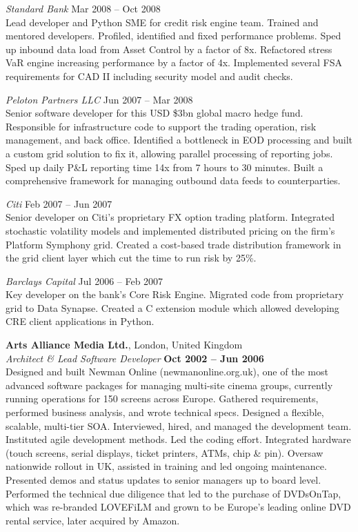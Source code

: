 \documentclass[margin,line]{resume}
\begin{document}
\begin{resume}
    \textsl{Standard Bank} \hfill Mar 2008 -- Oct 2008\\
    Lead developer and Python SME for credit risk engine team. Trained and mentored developers. Profiled, identified and fixed performance
    problems. Sped up inbound data load from Asset Control by a factor of 8x. Refactored stress VaR engine increasing performance by
    a factor of 4x. Implemented several FSA requirements for CAD II including security model and audit checks.     

    \textsl{Peloton Partners LLC} \hfill Jun 2007 -- Mar 2008\\
	Senior software developer for this USD \$3bn global macro hedge fund. Responsible for infrastructure code to 
	support the trading operation, risk management, and back office. Identified a bottleneck in EOD processing and built a 
	custom grid solution to fix it, allowing parallel processing of reporting jobs. Sped up daily P\&L reporting time 14x 
	from 7 hours to 30 minutes. Built a comprehensive framework for managing outbound data feeds to counterparties.
	
    \textsl{Citi} \hfill Feb 2007 -- Jun 2007\\
	Senior developer on Citi's proprietary FX option trading platform. Integrated stochastic volatility models and implemented
	distributed pricing on the firm's Platform Symphony grid. Created a cost-based trade distribution framework in the grid client layer which
	cut the time to run risk by 25\%.
	
    \textsl{Barclays Capital} \hfill Jul 2006 -- Feb 2007\\
	Key developer on the bank’s Core Risk Engine. Migrated code from proprietary grid to Data Synapse. 
	Created a C extension module which allowed developing CRE client applications in Python.
	
    \textbf{Arts Alliance Media Ltd.}, London, United Kingdom \vspace{2mm}\\\vspace{1mm}%
    \textsl{Architect \& Lead Software Developer} \hfill \textbf{Oct 2002 -- Jun 2006}\\
	Designed and built Newman Online (newmanonline.org.uk), one of the most advanced software 
	packages for managing 
 	multi-site cinema groups, currently running operations for 150 screens across Europe. Gathered requirements, 
 	performed business analysis, and wrote technical specs. Designed a flexible, scalable, multi-tier SOA. 
	Interviewed, hired, and managed the development team. Instituted agile development methods. 
	Led the coding effort. Integrated hardware (touch screens, serial displays, ticket printers, ATMs, chip \& pin).  
	Oversaw nationwide rollout in UK, assisted in training and led ongoing maintenance. Presented demos and status updates to 
	senior managers up to board level. Performed the technical due diligence that led to the purchase of DVDsOnTap, which was 
	re-branded LOVEFiLM and grown to be Europe's leading online DVD rental service, later acquired by Amazon.


\end{resume}
\end{document}
